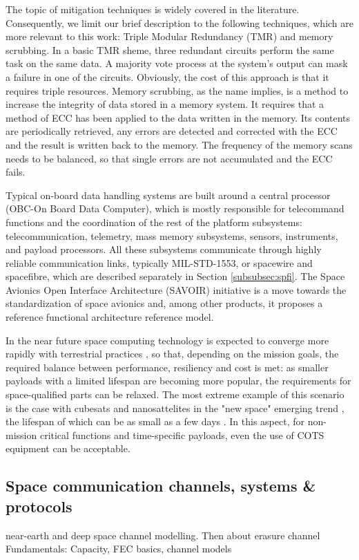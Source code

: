 The topic of mitigation techniques is widely covered in the literature. Consequently, we limit our brief description to the following techniques, which are more relevant to this work: Triple Modular Redundancy (TMR) and memory scrubbing. In a basic TMR sheme, three redundant circuits perform the same task on the same data. A majority vote process at the system's output can mask a failure in one of the circuits. Obviously, the cost of this approach is that it requires triple resources. Memory scrubbing, as the name implies, is a method to increase the integrity of data stored in a memory system. It requires that a method of ECC has been applied to the data written in the memory. Its contents are periodically retrieved, any errors are detected and corrected with the ECC and the result is written back to the memory. The frequency of the memory scans needs to be balanced, so that single errors are not accumulated and the ECC fails.\par
Typical on-board data handling systems are built around a central processor (OBC-On Board Data Computer), which is mostly responsible for telecommand functions and the coordination of the rest of the platform subsystems: telecommunication, telemetry, mass memory subsystems, sensors, instruments,  and payload processors. All these subsystems communicate through highly reliable communication links, typically MIL-STD-1553, or spacewire and spacefibre, which are described separately in Section \ref{subsubsec:spfi}. The Space Avionics Open Interface Architecture (SAVOIR) initiative is a move towards the standardization of space avionics and, among other products, it proposes a reference functional architecture reference model.\par
In the near future space computing technology is expected to converge more rapidly with terrestrial practices \cite{Furano2018}, so that, depending on the mission goals, the required balance between performance, resiliency and cost is met: as smaller payloads with a limited lifespan are becoming more popular, the requirements for space-qualified parts can be relaxed. The most extreme example of this scenario is the case with cubesats and nanosattelites in the "new space" emerging trend \cite{newspace}, the lifespan of which can be as small as a few days \cite{Oltrogge}. In this aspect, for non-mission critical functions and time-specific payloads, even the use of COTS equipment can be acceptable.\par


\subsection{Space communication channels, systems \& protocols}
near-earth and deep space channel modelling. Then about erasure channel 
Fundamentals: Capacity, FEC basics, channel models

